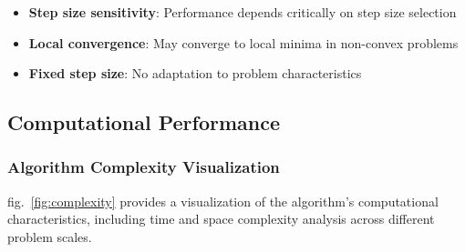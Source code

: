 \documentclass[
  english,
]{article}
\providecommand{\tightlist}{%
  \setlength{\itemsep}{0pt}\setlength{\parskip}{0pt}}
\begin{document}
\begin{itemize}
\tightlist
\item
  \textbf{Step size sensitivity}: Performance depends critically on step
  size selection
\item
  \textbf{Local convergence}: May converge to local minima in non-convex
  problems
\item
  \textbf{Fixed step size}: No adaptation to problem characteristics
\end{itemize}

\subsection{Computational Performance}\label{computational-performance}

\subsubsection{Algorithm Complexity
Visualization}\label{algorithm-complexity-visualization}

fig.~\ref{fig:complexity} provides a visualization of the algorithm's
computational characteristics, including time and space complexity
analysis across different problem scales.
\end{document}
